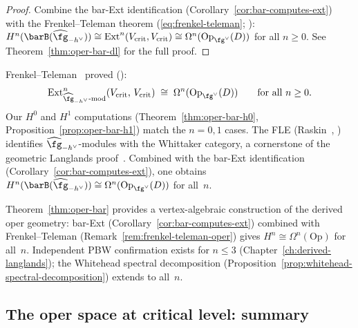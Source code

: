 \begin{proof}
Combine the bar-Ext identification
(Corollary~\ref{cor:bar-computes-ext}) with the
Frenkel--Teleman theorem
(\eqref{eq:frenkel-teleman}; \cite{FT06}):
$H^n(\barB(\widehat{\fg}_{-h^\vee}))
\cong \mathrm{Ext}^n(V_{\mathrm{crit}}, V_{\mathrm{crit}})
\cong \Omega^n(\mathrm{Op}_{\fg^\vee}(D))$
for all $n \geq 0$.  See
Theorem~\ref{thm:oper-bar-dl} for the full proof.
\end{proof}

\begin{remark}%
\label{rem:frenkel-teleman-oper}
Frenkel--Teleman~\cite{FT06} proved (\ClaimStatusProvedElsewhere):
\begin{equation}\label{eq:frenkel-teleman}
\mathrm{Ext}^n_{\widehat{\fg}_{-h^\vee}\text{-mod}}
(V_{\mathrm{crit}},\, V_{\mathrm{crit}})
\;\cong\; \Omega^n(\mathrm{Op}_{\fg^\vee}(D))
\qquad \text{for all } n \geq 0.
\end{equation}
Our $H^0$ and $H^1$ computations (Theorem~\ref{thm:oper-bar-h0}, Proposition~\ref{prop:oper-bar-h1}) match the $n = 0,1$ cases.  The FLE (Raskin~\cite{Raskin24}, \ClaimStatusProvedElsewhere)
identifies $\widehat{\fg}_{-h^\vee}$-modules with the Whittaker category, a cornerstone of the geometric Langlands proof~\cite{GLC24}.  Combined with the bar-Ext identification (Corollary~\ref{cor:bar-computes-ext}), one obtains $H^n(\barB(\widehat{\fg}_{-h^\vee})) \cong \Omega^n(\mathrm{Op}_{\fg^\vee}(D))$ for all~$n$.
\end{remark}

\begin{remark}[Scope]\label{rem:oper-bar-scope}
Theorem~\ref{thm:oper-bar} provides a vertex-algebraic construction of the derived oper geometry: bar-Ext (Corollary~\ref{cor:bar-computes-ext}) combined with Frenkel--Teleman (Remark~\ref{rem:frenkel-teleman-oper}) gives $H^n \cong \Omega^n(\mathrm{Op})$ for all~$n$.  Independent PBW confirmation exists for $n \leq 3$ (Chapter~\ref{ch:derived-langlands}); the Whitehead spectral decomposition (Proposition~\ref{prop:whitehead-spectral-decomposition}) extends to all~$n$.
\end{remark}

\subsection{The oper space at critical level: summary}
\label{subsec:oper-critical-summary}

